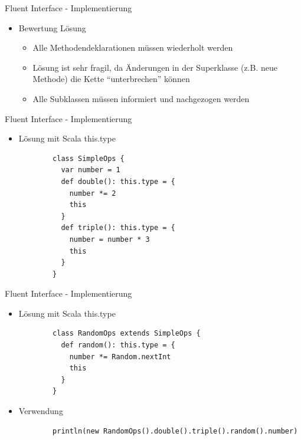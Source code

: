 \documentclass{beamer}
\begin{document}

\begin{frame}[fragile]{Fluent Interface - Implementierung}
\begin{itemize}
	\item Bewertung Lösung
		\begin{itemize}
			\item Alle Methodendeklarationen müssen wiederholt werden
			\item Lösung ist sehr fragil, da Änderungen in der Superklasse (z.B. neue Methode) die Kette "`unterbrechen"' können
			\item Alle Subklassen müssen informiert und nachgezogen werden
		\end{itemize}
\end{itemize}
\end{frame}


\begin{frame}[fragile]{Fluent Interface - Implementierung}
\begin{itemize}
	\item Lösung mit Scala this.type
		\begin{lstlisting}
		class SimpleOps {
		  var number = 1
		  def double(): this.type = {
		    number *= 2
		    this
		  }
		  def triple(): this.type = {
		    number = number * 3
		    this
		  }
		}
		\end{lstlisting}
\end{itemize}
\end{frame}


\begin{frame}[fragile]{Fluent Interface - Implementierung}
\begin{itemize}
	\item Lösung mit Scala this.type
		\begin{lstlisting}
		class RandomOps extends SimpleOps {
		  def random(): this.type = {
		    number *= Random.nextInt
		    this
		  }
		}
		\end{lstlisting}
	\item Verwendung
		\begin{lstlisting}
		println(new RandomOps().double().triple().random().number)
		\end{lstlisting}
\end{itemize}
\end{frame}
\end{document}
